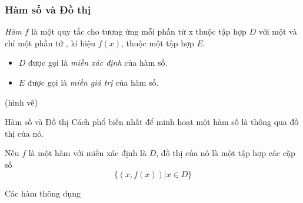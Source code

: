 \begin{frame}
    \frametitle{Hàm số và Đồ thị}
    \begin{tcolorbox}[colback=blue!10!, colframe=blue!50!black, title=Định nghĩa]
        \textit{Hàm} $f$ là một quy tắc cho tương ứng mỗi phần tử x thuộc tập hợp $D$ với một và chỉ một phần tử , kí hiệu $f(x)$, thuộc một tập hợp $E$.
    \end{tcolorbox}
    \begin{itemize}
        \item $D$ được gọi là \textit{miền xác định} của hàm số.
        \item $E$ được gọi là \textit{miền giá trị} của hàm số.
    \end{itemize}
    (hình vẽ)
    \end{frame}
    
    \begin{frame}{Hàm số và Đồ thị}
        Cách phổ biến nhất để minh hoạt một hàm số là thông qua đồ thị của nó.
        \begin{tcolorbox}[colback=blue!10!, colframe=blue!50!black, title=]
            Nếu $f$ là một hàm với miền xác định là $D$, đồ thị của nó là một tập hợp các cặp số $$ \{(x,f(x))\vert x\in D\}$$
        \end{tcolorbox}
    \end{frame}
    \begin{frame}{Các hàm thông dụng}
        
    \end{frame}